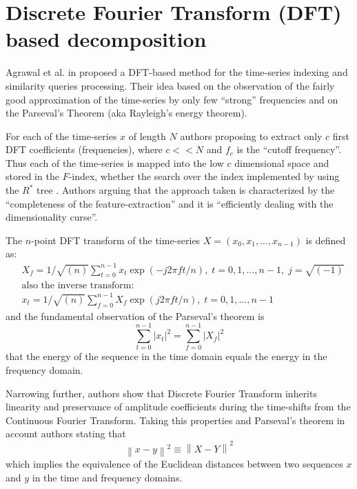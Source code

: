 \section{Discrete Fourier Transform (DFT) based decomposition}
Agrawal et al. in \cite{citeulike:3973409} proposed a DFT-based method for the time-series indexing and similarity queries processing. Their idea based on the observation of the fairly good approximation of the time-series by only few ``strong'' frequencies and on the Parseval's Theorem (aka Rayleigh's energy theorem). 

For each of the time-series $x$ of length $N$ authors proposing to extract only $c$ first DFT coefficients (frequencies), where $c<<N$ and $f_{c}$ is the ``cutoff frequency''. Thus each of the time-series is mapped into the low $c$ dimensional space and stored in the $F$-index, whether the search over the index implemented by using the $R^{*}$ tree \cite{citeulike:343069}. Authors arguing that the approach taken is characterized by the ``completeness of the feature-extraction'' and it is ``efficiently dealing with the dimensionality curse''. 

The $n$-point DFT transform of the time-series $X=(x_{0}, x_{1}, ... , x_{n-1})$ is defined as:
\begin{align}
& X_{f} = 1/\sqrt{(n)}\sum_{t=0}^{n-1} x_{t} \exp(-j2 \pi f t/n),\; t=0,1,...,n-1, \; j=\sqrt{(-1)} \\
& \text{also the inverse transform:} \nonumber \\
& x_{t} = 1/\sqrt{(n)}\sum_{f=0}^{n-1} X_{f} \exp(j2 \pi f t/n),\; t=0,1,...,n-1 
\end{align}
and the fundamental observation of the Parseval's theorem is
\begin{equation}
\sum_{t=0}^{n-1} \left| x_{t} \right| ^{2} = \sum_{f=0}^{n-1} \left| X_{f} \right| ^{2}
\label{eq:parseval}
\end{equation}
that the energy of the sequence in the time domain equals the energy in the frequency domain.

Narrowing further, authors show that Discrete Fourier Transform inherits linearity and preservance of amplitude coefficients during the time-shifts from the Continuous Fourier Transform. Taking this properties and Parseval's theorem in account authors stating that
\begin{equation}
\left\| x - y \right\| ^{2} \equiv \left\| X - Y \right\| ^{2}
\label{eq:dft_similarity}
\end{equation}
which implies the equivalence of the Euclidean distances between two sequences $x$ and $y$ in the time and frequency domains. 

